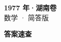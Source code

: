 \documentclass[zihao=-4, a4paper]{ctexart}
\begin{document}
\begin{center}
  {\Large\bfseries 1977 年·湖南卷}\\[4pt]
  {\large 数学 · 简答版}
\end{center}
\medskip
{}

\clearpage
{}
\begin{center}{\Large\bfseries 答案速查}\end{center}
\medskip

\end{document}
